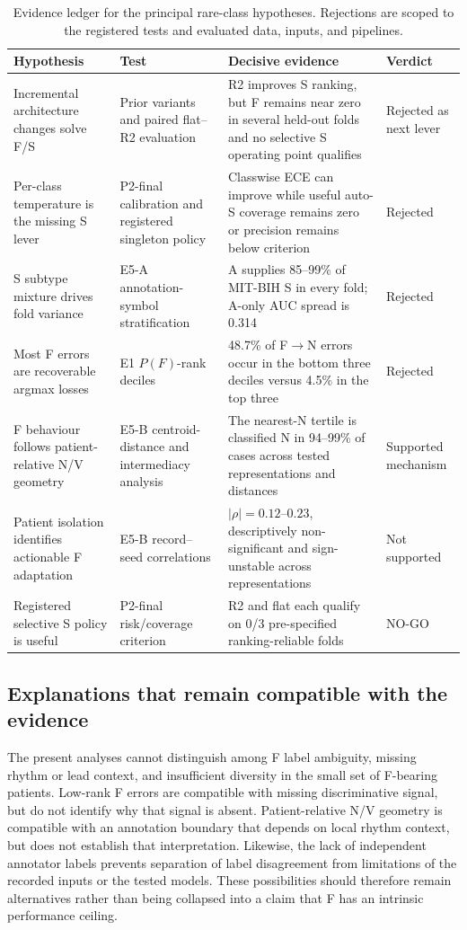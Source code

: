 \documentclass[pdflatex,sn-mathphys-num]{sn-jnl}
\begin{document}
\begin{table}[htbp]
\caption{Evidence ledger for the principal rare-class hypotheses. Rejections
are scoped to the registered tests and evaluated data, inputs, and pipelines.}
\label{tab:hypothesis-ledger}
\centering
\small
\begin{tabular}{@{}p{}p{}p{}p{}@{}}
\toprule
Hypothesis & Test & Decisive evidence & Verdict \\
\midrule
Incremental architecture changes solve F/S & Prior variants and paired flat--R2
evaluation & R2 improves S ranking, but F remains near zero in several held-out
folds and no selective S operating point qualifies & Rejected as next lever \\
Per-class temperature is the missing S lever & P2-final calibration and
registered singleton policy & Classwise ECE can improve while useful auto-S
coverage remains zero or precision remains below criterion & Rejected \\
S subtype mixture drives fold variance & E5-A annotation-symbol stratification
& A supplies 85--99\% of MIT-BIH S in every fold; A-only AUC spread is 0.314 &
Rejected \\
Most F errors are recoverable argmax losses & E1 $P(F)$-rank deciles & 48.7\%
of F$\rightarrow$N errors occur in the bottom three deciles versus 4.5\% in the
top three & Rejected \\
F behaviour follows patient-relative N/V geometry & E5-B centroid-distance and
intermediacy analysis & The nearest-N tertile is classified N in 94--99\% of
cases across tested representations and distances & Supported mechanism \\
Patient isolation identifies actionable F adaptation & E5-B record--seed
correlations & $|\rho|=0.12$--$0.23$, descriptively non-significant and
sign-unstable across representations & Not supported \\
Registered selective S policy is useful & P2-final risk/coverage criterion & R2
and flat each qualify on 0/3 pre-specified ranking-reliable folds & NO-GO \\
\bottomrule
\end{tabular}
\end{table}

\subsection{Explanations that remain compatible with the evidence}
The present analyses cannot distinguish among F label ambiguity, missing rhythm
or lead context, and insufficient diversity in the small set of F-bearing
patients. Low-rank F errors are compatible with missing discriminative signal,
but do not identify why that signal is absent. Patient-relative N/V geometry is
compatible with an annotation boundary that depends on local rhythm context,
but does not establish that interpretation. Likewise, the lack of independent
annotator labels prevents separation of label disagreement from limitations of
the recorded inputs or the tested models. These possibilities should therefore
remain alternatives rather than being collapsed into a claim that F has an
intrinsic performance ceiling.
\end{document}
